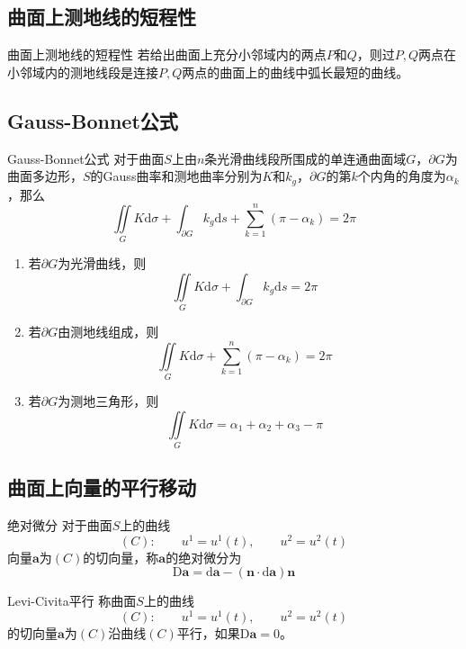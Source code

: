 \documentclass[lang = cn, scheme = chinese, thmcnt = section]{elegantbook}
\newcommand{\bs}{\boldsymbol}          %
\newcommand{\dd}{\mathrm{d}}           %
\newcommand{\DD}{\mathrm{D}}           %
\begin{document}
\subsection{曲面上测地线的短程性}

\begin{theorem}{曲面上测地线的短程性}
	若给出曲面上充分小邻域内的两点$P$和$Q$，则过$P,Q$两点在小邻域内的测地线段是连接$P,Q$两点的曲面上的曲线中弧长最短的曲线。
\end{theorem}

\subsection{Gauss-Bonnet公式}

\begin{theorem}{Gauss-Bonnet公式}
	对于曲面$S$上由$n$条光滑曲线段所围成的单连通曲面域$G$，$\partial G$为曲面多边形，$S$的Gauss曲率和测地曲率分别为$K$和$k_g$，$\partial G$的第$k$个内角的角度为$\alpha_k$，那么
	$$
	\iint\limits_{G}K\dd\sigma+\int_{\partial G}k_g\dd s+\sum_{k=1}^{n}(\pi-\alpha_k)=2\pi
	$$
\end{theorem}

\begin{corollary}
	\begin{enumerate}
		\item 若$\partial G$为光滑曲线，则
		$$
		\iint\limits_{G}K\dd\sigma+\int_{\partial G}k_g\dd s=2\pi
		$$
		\item 若$\partial G$由测地线组成，则
		$$
		\iint\limits_{G}K\dd\sigma+\sum_{k=1}^{n}(\pi-\alpha_k)=2\pi
		$$
		\item 若$\partial G$为测地三角形，则
		$$
		\iint\limits_{G}K\dd\sigma=\alpha_1+\alpha_2+\alpha_3-\pi
		$$
	\end{enumerate}
\end{corollary}

\subsection{曲面上向量的平行移动}

\begin{definition}{绝对微分}
	对于曲面$S$上的曲线
	$$
	(C):\qquad
	u^1=u^1(t),\qquad
	u^2=u^2(t)
	$$
	向量$\bs{a}$为$(C)$的切向量，称$\bs{a}$的绝对微分为%
	$$
	\DD\bs{a}=\dd \bs{a}-(\bs{n}\cdot\dd\bs{a})\bs{n}
	$$
\end{definition}

\begin{definition}{Levi-Civita平行}
	称曲面$S$上的曲线
	$$
	(C):\qquad
	u^1=u^1(t),\qquad
	u^2=u^2(t)
	$$
	的切向量$\bs{a}$为$(C)$沿曲线$(C)$平行，如果$\DD\bs{a}=0$。
\end{definition}
\end{document}
